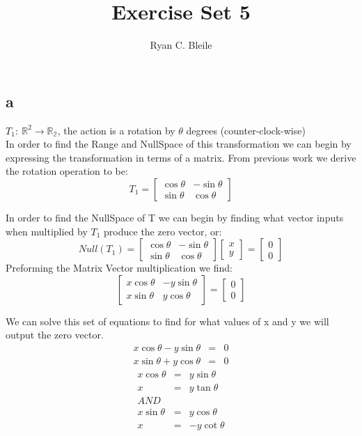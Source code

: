 \documentclass[12pt]{article}
\title{Exercise Set 5}
\author{Ryan C. Bleile}
\begin{document}
\maketitle

\section{}

\subsection*{a}

$ T_{1}:\ \mathbb{R}^{2} \rightarrow \mathbb{R_{2}} $, the action is a rotation by $\theta$ degrees (counter-clock-wise)\\

In order to find the Range and NullSpace of this transformation we can begin by expressing the transformation in terms of a matrix. From previous work we derive the rotation operation to be:\\
\[
T_{1} = 
\begin{bmatrix}
\cos \theta & -\sin \theta\\
\sin \theta & \cos \theta
\end{bmatrix}
\]

In order to find the NullSpace of T we can begin by finding what vector inputs when multiplied by $T_{1}$ produce the zero vector, or:
\[
Null(T_{1}) = 
\begin{bmatrix}
\cos \theta & -\sin \theta\\
\sin \theta & \cos \theta
\end{bmatrix}
\begin{bmatrix}
x\\
y
\end{bmatrix}
=
\begin{bmatrix}
0\\
0
\end{bmatrix}
\]
Preforming the Matrix Vector multiplication we find:
\[
\begin{bmatrix}
x \cos \theta & - y \sin \theta\\
x \sin \theta & y \cos \theta
\end{bmatrix}
=
\begin{bmatrix}
0\\
0
\end{bmatrix}
\]

We can solve this set of equations to find for what values of x and y we will output the zero vector.\\
\begin{eqnarray}
x \cos \theta - y \sin \theta &=& 0\\
x \sin \theta + y \cos \theta &=& 0
\end{eqnarray}
\begin{eqnarray*}
x \cos \theta &=& y \sin \theta \\
x &=& y \tan \theta\\
AND\\
x \sin \theta &=& y \cos \theta\\
x &=& -y \cot \theta
\end{eqnarray*}
\end{document}
